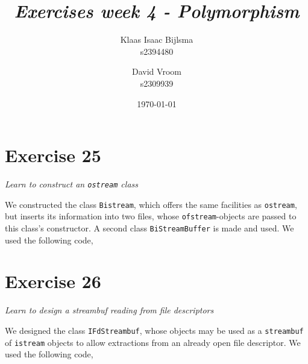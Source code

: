 \documentclass[12pt]{article}
\title{\itshape Exercises week 4 - Polymorphism}
\author{
	Klaas Isaac Bijlsma \\ s2394480
	\and
	David Vroom \\ s2309939
}
\date{\today}
\newcommand{\desc}[1]{\textit{#1} \vspace{1em}}
\begin{document}
\maketitle

\section*{Exercise 25}
\desc{Learn to construct an \texttt{ostream} class}

We constructed the class \texttt{Bistream}, which offers the same facilities as \texttt{ostream}, but inserts its information into two files, whose \texttt{ofstream}-objects are passed to this class's constructor. A second class \texttt{BiStreamBuffer} is made and used. We used the following code,









\clearpage

\section*{Exercise 26}
\desc{Learn to design a streambuf reading from file descriptors}

We designed the class \texttt{IFdStreambuf}, whose objects may be used as a \texttt{streambuf} of \texttt{istream} objects to allow extractions from an already open file descriptor. We used the following code,










\end{document}
